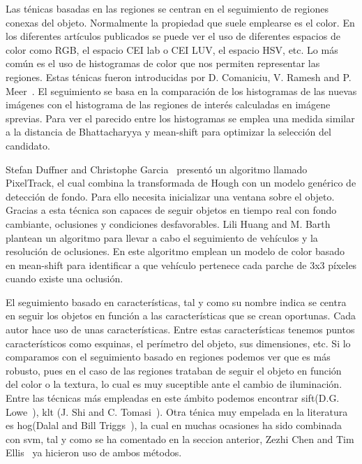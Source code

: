 Las ténicas basadas en las regiones se centran en el seguimiento de regiones conexas del objeto. Normalmente la propiedad que suele emplearse es el color. En los diferentes artículos publicados se puede ver el uso de diferentes espacios de color como RGB, el espacio CEI lab o CEI LUV, el espacio HSV, etc. Lo más común es el uso de histogramas de color que nos permiten representar las regiones. Estas ténicas fueron introducidas por D. Comaniciu, V. Ramesh and P. Meer~\cite{kernel_based_object}. El seguimiento se basa en la comparación de los histogramas de las nuevas imágenes con el histograma de las regiones de interés calculadas en imágene sprevias. Para ver el parecido entre los histogramas se emplea una medida similar a la distancia de Bhattacharyya y mean-shift para optimizar la selección del candidato.

Stefan Duffner and Christophe Garcia~\cite{pixeltrack} presentó un algoritmo llamado PixelTrack, el cual combina la transformada de Hough con un modelo genérico de detección de fondo. Para ello necesita inicializar una ventana sobre el objeto. Gracias a esta técnica son capaces de seguir objetos en tiempo real con fondo cambiante, oclusiones y condiciones desfavorables.
Lili Huang and M. Barth~\cite{real_time_vehicle} plantean un algoritmo para llevar a cabo el seguimiento de vehículos y la resolución de oclusiones. En este algoritmo emplean un modelo de color basado en mean-shift para identificar a que vehículo pertenece cada parche de 3x3 píxeles cuando existe una oclusión.

El seguimiento basado en características, tal y como su nombre indica se centra en seguir los objetos en función a las características que se crean oportunas. Cada autor hace uso de unas características. Entre estas características tenemos puntos característicos como esquinas, el perímetro del objeto, sus dimensiones, etc. Si lo comparamos con el seguimiento basado en regiones podemos ver que es más robusto, pues en el caso de las regiones trataban de seguir el objeto en función del color o la textura, lo cual es muy suceptible ante el cambio de iluminación. Entre las técnicas más empleadas en este ámbito podemos encontrar \acrfull{sift}(D.G. Lowe~\cite{article_sift}), \acrfull{klt} (J. Shi and C. Tomasi~\cite{article_klt}). Otra ténica muy empelada en la literatura es \acrshort{hog}(Dalal and Bill Triggs~\cite{hog_paper}), la cual en muchas ocasiones ha sido combinada con \acrshort{svm}, tal y como se ha comentado en la seccion anterior, Zezhi Chen and Tim Ellis~\cite{multi_shape_descriptor} ya hicieron uso de ambos métodos.



